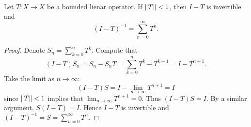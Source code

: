\begin{theorem}
    Let $T:X\to X$ be a bounded lienar operator. If $\left\lVert {T} \right\rVert<1$, then $I-T$ is invertible and
    \begin{equation*}
        (I-T)^{-1} = \sum_{n=0}^\infty T^n.
    \end{equation*}
\end{theorem}
\begin{proof}
    Denote $S_n = \sum_{k=0}^n T^k$. Compute that 
    \begin{equation*}
        (I-T)S_n = S_n - S_nT = \sum_{k=0}^n T^k - T^{k+1} = I - T^{n+1}.
    \end{equation*}
    Take the limit as $n\to\infty$: 
    \begin{equation*}
        (I-T)S = I - \lim_{n\to\infty} T^{n+1} = I
    \end{equation*}
    since $\left\lVert {T} \right\rVert<1$ implies that $\lim_{n\to\infty} T^{n+1} = 0$. 
    Thus $(I-T)S = I$. By a similar argument, $S(I-T) = I$. Hence 
    $I-T$ is invertible and $(I-T)^{-1} = S = \sum_{n=0}^\infty T^n$.
\end{proof}

